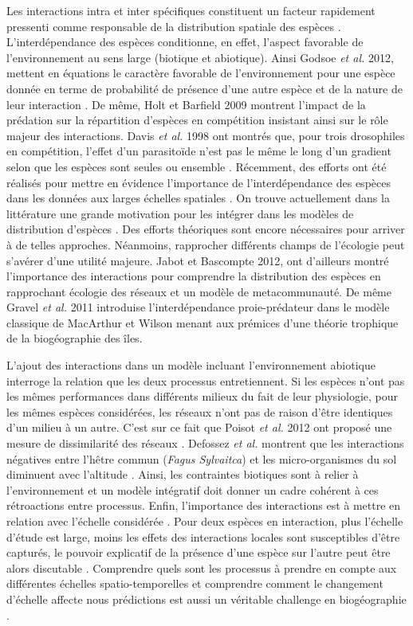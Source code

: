 Les interactions intra et inter spécifiques constituent un facteur
rapidement pressenti comme responsable de la distribution spatiale des
espèces \cite{Levin1974}. L'interdépendance des espèces conditionne, en
effet, l'aspect favorable de l'environnement au sens large (biotique et
abiotique). Ainsi Godsoe \textit{et al.} 2012, mettent en équations le
caractère favorable de l'environnement pour une espèce donnée en terme
de probabilité de présence d'une autre espèce et de la nature de leur
interaction \cite{Godsoe2012}. De même, Holt et Barfield 2009 montrent
l'impact de la prédation sur la répartition d'espèces en compétition
\cite{Holt2009} insistant ainsi sur le rôle majeur des interactions.
Davis \textit{et al.} 1998 ont montrés que, pour trois drosophiles en
compétition, l'effet d'un parasitoïde n'est pas le même le long d'un
gradient selon que les espèces sont seules ou ensemble \cite{Davis1998}.
Récemment, des efforts ont été réalisés pour mettre en évidence
l'importance de l'interdépendance des espèces dans les données aux
larges échelles spatiales \cite{Gotelli2010}. On trouve actuellement
dans la littérature une grande motivation pour les intégrer dans les
modèles de distribution d'espèces \cite{Kissling2011, Guisan2011}. Des
efforts théoriques sont encore nécessaires pour arriver à de telles
approches. Néanmoins, rapprocher différents champs de l'écologie peut
s'avérer d'une utilité majeure. Jabot et Bascompte \cite{Jabot2012}
2012, ont d'ailleurs montré l'importance des interactions pour
comprendre la distribution des espèces en rapprochant écologie des
réseaux et un modèle de metacommunauté. De même Gravel \textit{et al.}
2011 \cite{Gravel2011b} introduise l'interdépendance proie-prédateur
dans le modèle classique de MacArthur et Wilson menant aux prémices
d'une théorie trophique de la biogéographie des îles.

L'ajout des interactions dans un modèle incluant l'environnement
abiotique interroge la relation que les deux processus entretiennent. Si
les espèces n'ont pas les mêmes performances dans différents milieux du
fait de leur physiologie, pour les mêmes espèces considérées, les
réseaux n'ont pas de raison d'être identiques d'un milieu à un autre.
C'est sur ce fait que Poisot \textit{et al.} 2012 ont proposé une mesure
de dissimilarité des réseaux \cite{Poisot2012}. Defossez \textit{et al.}
montrent que les interactions négatives entre l'hêtre commun
(\textit{Fagus Sylvaitca}) et les micro-organismes du sol diminuent avec
l'altitude \cite{Defossez2011}. Ainsi, les contraintes biotiques sont à
relier à l'environnement \cite{Brooker2006,Canham2006} et un modèle
intégratif doit donner un cadre cohérent à ces rétroactions entre
processus. Enfin, l'importance des interactions est à mettre en relation
avec l'échelle considérée \cite{Peterson2011}. Pour deux espèces en
interaction, plus l'échelle d'étude est large, moins les effets des
interactions locales sont susceptibles d'être capturés, le pouvoir
explicatif de la présence d'une espèce sur l'autre peut être alors
discutable \cite{Araujo2007}. Comprendre quels sont les processus à
prendre en compte aux différentes échelles spatio-temporelles et
comprendre comment le changement d'échelle affecte nous prédictions est
aussi un véritable challenge en biogéographie \cite{Martinez2012}.


